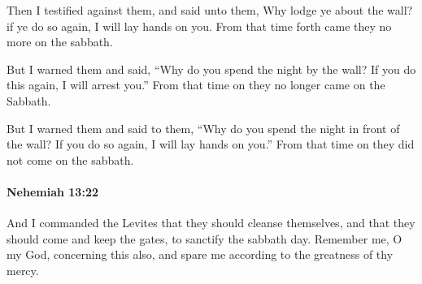 			\begin{versebox}
					\item[BHS] 
					\item[LXX] 
					\item[ASV] Then I testified against them, and said unto them, Why lodge ye about the wall? if ye do so again, I will lay hands on you. From that time forth came they no more on the sabbath.
					\item[NIV] But I warned them and said, “Why do you spend the night by the wall? If you do this again, I will arrest you.” From that time on they no longer came on the Sabbath.
					\item[NRSV] But I warned them and said to them, “Why do you spend the night in front of the wall? If you do so again, I will lay hands on you.” From that time on they did not come on the sabbath.
			\end{versebox}

		\paragraph{Nehemiah 13:22} %
			\label{NEHEMIAH-13-22}

			And I commanded the Levites that they should cleanse themselves, and that they should come and keep the gates, to sanctify the sabbath day. Remember me, O my God, concerning this also, and spare me according to the greatness of thy mercy.

